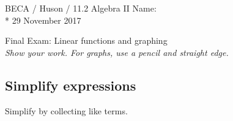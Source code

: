 \documentclass[]{book}
\begin{document}
\noindent BECA / Huson / 11.2 Algebra II \hspace{2in} Name:\\*
29 November 2017
\begin{center}
{\Large Final Exam: Linear functions and graphing}\\
\textit{Show your work. For graphs, use a pencil and straight edge.}
\end{center}



\subsection*{Simplify expressions}

Simplify by collecting like terms.
\end{document}
